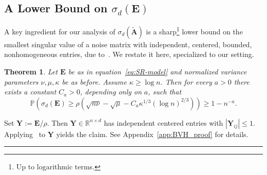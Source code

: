 \documentclass{article}
\newcommand{\Var}{\operatorname{Var}}   %
\newcommand{\pr}[1]{\mbox{}\mathbb{P}\left(#1\right)}
\newcommand{\R}{\mathbb{R}} %
\newcommand{\Ab}{\mathbf{A}}
\newcommand{\Eb}{\mathbf{E}}
\newcommand{\Yb}{\mathbf{Y}}
\newcommand{\Abtil}{\tilde{\Ab}}
\newcommand{\BlackBox}{\rule{1.5ex}{1.5ex}}  %
\newenvironment{proof}{\par\noindent{\bf Proof\ }}{\hfill\BlackBox\par\medskip}
\newtheorem{theorem}{Theorem}
\newcommand{\rbr}[1]{\left(#1\right)}
\newcommand{\abr}[1]{\left|#1\right|}
\begin{document}
\subsection{A Lower Bound on $\sigma_d(\Eb)$}\label{subsec:bvh}
A key ingredient for our analysis of $\sigma_d(\Abtil)$ is a sharp\footnote{Up to logarithmic terms.} lower bound on the smallest singular value of a noise matrix with independent, centered, bounded, nonhomogeneous entries, due to~\citep[Corollary~3.18]{brailovskaya2024universality}. We restate it here, specialized to our setting.

\begin{theorem}\label{prop:BVH}
Let $\Eb$ be as in equation~\eqref{eq:SR-model} and normalized variance parameters $\nu, \mu, \kappa$ be as before. Assume $\kappa \ge \log n$. Then for every $a > 0$ there exists a constant $C_a > 0$, depending only on $a$, such that
\begin{equation*}
    \pr{\sigma_d(\Eb) \ge \rho\rbr{\sqrt{n\nu} - \sqrt{\mu} - C_a \kappa^{1/3}(\log n)^{2/3}}} \ge 1 - n^{-a}.
\end{equation*}
\end{theorem}
\begin{proof}
Set $\Yb := \Eb/\rho$. Then $\Yb \in \R^{n \times d}$ has independent centered entries with $\abr{\Yb_{ij}} \le 1$. Applying~\citep[Corollary~3.18]{brailovskaya2024universality} to $\Yb$ yields the claim. See Appendix~\ref{app:BVH_proof} for details.
\end{proof}
\end{document}
